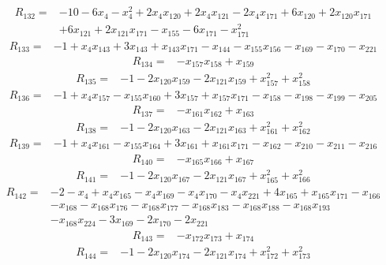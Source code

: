 \[\begin{aligned}R_{132}={}&-10-6x_{4}-x_{4}^{2}+2x_{4}x_{120}+2x_{4}x_{121}-2x_{4}x_{171}+6x_{120}+2x_{120}x_{171}
\\&+6x_{121}+2x_{121}x_{171}-x_{155}-6x_{171}-x_{171}^{2}
\end{aligned}\]
\[\begin{aligned}R_{133}={}&-1+x_{4}x_{143}+3x_{143}+x_{143}x_{171}-x_{144}-x_{155}x_{156}-x_{169}-x_{170}-x_{221}
\end{aligned}\]
\[\begin{aligned}R_{134}={}&-x_{157}x_{158}+x_{159}
\end{aligned}\]
\[\begin{aligned}R_{135}={}&-1-2x_{120}x_{159}-2x_{121}x_{159}+x_{157}^{2}+x_{158}^{2}
\end{aligned}\]
\[\begin{aligned}R_{136}={}&-1+x_{4}x_{157}-x_{155}x_{160}+3x_{157}+x_{157}x_{171}-x_{158}-x_{198}-x_{199}-x_{205}
\end{aligned}\]
\[\begin{aligned}R_{137}={}&-x_{161}x_{162}+x_{163}
\end{aligned}\]
\[\begin{aligned}R_{138}={}&-1-2x_{120}x_{163}-2x_{121}x_{163}+x_{161}^{2}+x_{162}^{2}
\end{aligned}\]
\[\begin{aligned}R_{139}={}&-1+x_{4}x_{161}-x_{155}x_{164}+3x_{161}+x_{161}x_{171}-x_{162}-x_{210}-x_{211}-x_{216}
\end{aligned}\]
\[\begin{aligned}R_{140}={}&-x_{165}x_{166}+x_{167}
\end{aligned}\]
\[\begin{aligned}R_{141}={}&-1-2x_{120}x_{167}-2x_{121}x_{167}+x_{165}^{2}+x_{166}^{2}
\end{aligned}\]
\[\begin{aligned}R_{142}={}&-2-x_{4}+x_{4}x_{165}-x_{4}x_{169}-x_{4}x_{170}-x_{4}x_{221}+4x_{165}+x_{165}x_{171}-x_{166}
\\&-x_{168}-x_{168}x_{176}-x_{168}x_{177}-x_{168}x_{183}-x_{168}x_{188}-x_{168}x_{193}
\\&-x_{168}x_{224}-3x_{169}-2x_{170}-2x_{221}
\end{aligned}\]
\[\begin{aligned}R_{143}={}&-x_{172}x_{173}+x_{174}
\end{aligned}\]
\[\begin{aligned}R_{144}={}&-1-2x_{120}x_{174}-2x_{121}x_{174}+x_{172}^{2}+x_{173}^{2}
\end{aligned}\]
